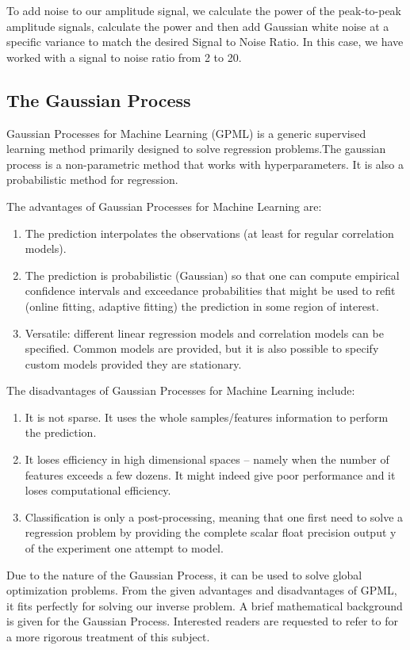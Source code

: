 To add noise to our amplitude signal, we calculate the power of the peak-to-peak amplitude signals, calculate the power and then add Gaussian white noise at a specific variance to match the desired Signal to Noise Ratio. In this case, we have worked with a signal to noise ratio from 2 to 20.
\subsection{The Gaussian Process}
Gaussian Processes for Machine Learning (GPML) is a generic supervised learning method primarily designed to solve regression problems.The gaussian process is a non-parametric method that works with hyperparameters. It is also a probabilistic method for regression.

The advantages of Gaussian Processes for Machine Learning are:
\begin{enumerate}
        \item The prediction interpolates the observations (at least for regular correlation models).
        \item The prediction is probabilistic (Gaussian) so that one can compute empirical confidence intervals and exceedance probabilities that might be used to refit (online fitting, adaptive fitting) the prediction in some region of interest.
        \item Versatile: different linear regression models and correlation models can be specified. Common models are provided, but it is also possible to specify custom models provided they are stationary.
\end{enumerate}
The disadvantages of Gaussian Processes for Machine Learning include:
\begin{enumerate}


        \item It is not sparse. It uses the whole samples/features information to perform the prediction.
        \item It loses efficiency in high dimensional spaces – namely when the number of features exceeds a few dozens. It might indeed give poor performance and it loses computational efficiency.
        \item Classification is only a post-processing, meaning that one first need to solve a regression problem by providing the complete scalar float precision output y of the experiment one attempt to model.

\end{enumerate}

Due to the nature of the Gaussian Process, it can be used to solve global optimization problems. From the given advantages and disadvantages of GPML, it fits perfectly for solving our inverse problem. A brief mathematical background is given for the Gaussian Process. Interested readers are requested to refer to \cite{gp} \cite{gp_tut} for a more rigorous treatment of this subject.

